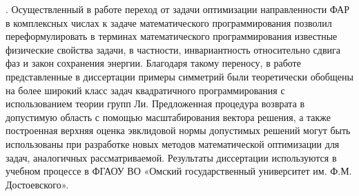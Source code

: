 {\theorInfluence}.
Осуществленный в работе переход от задачи оптимизации направленности ФАР в комплексных числах к задаче математического программирования позволил переформулировать в терминах математического программирования известные физические свойства задачи, в частности, инвариантность относительно сдвига фаз и закон сохранения энергии. Благодаря такому переносу, в работе~ представленные в диссертации примеры симметрий были теоретически обобщены на более широкий класс задач квадратичного программирования с использованием теории групп Ли. Предложенная процедура возврата в допустимую область с помощью масштабирования вектора решения, а также построенная верхняя оценка эвклидовой нормы допустимых решений могут быть использованы при разработке новых методов математической оптимизации для задач, аналогичных рассматриваемой. Результаты диссертации используются в учебном процессе в ФГАОУ ВО «Омский государственный университет
им. Ф.М. Достоевского».


